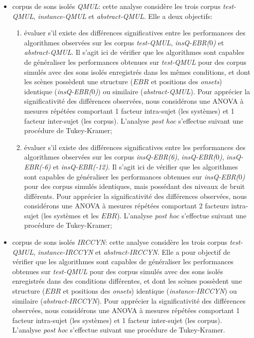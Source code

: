 \begin{itemize}

\item corpus de sons isolés \emph{QMUL}: cette analyse considère les trois corpus \emph{test-QMUL}, \emph{instance-QMUL} et \emph{abstract-QMUL}. Elle a deux objectifs:

\begin{enumerate}
\item évaluer s'il existe des différences significatives entre les performances des algorithmes observées sur les corpus \emph{test-QMUL}, \emph{insQ-EBR($0$)} et \emph{abstract-QMUL}. Il s'agit ici de vérifier que les algorithmes sont capables de généraliser les performances obtenues sur \emph{test-QMUL} pour des corpus simulés avec des sons isolés enregistrés dans les mêmes conditions, et dont les scènes possèdent une structure ($EBR$ et positions des \emph{onsets}) identique (\emph{insQ-EBR($0$)}) ou similaire (\emph{abstract-QMUL}). Pour apprécier la significativité des différences observées, nous considérons une ANOVA à mesures répétées comportant 1 facteur intra-sujet (les systèmes) et 1 facteur inter-sujet (les corpus). L'analyse \emph{post hoc} s'effectue suivant une procédure de Tukey-Kramer;

\item évaluer s'il existe des différences significatives entre les performances des algorithmes observées sur les corpus \emph{insQ-EBR(6)}, \emph{insQ-EBR($0$)}, \emph{insQ-EBR(-6)} et \emph{insQ-EBR(-12)}. Il s'agit ici de vérifier que les algorithmes sont capables de généraliser les performances obtenues sur \emph{insQ-EBR($0$)} pour des corpus simulés identiques, mais possédant des niveaux de bruit différents. Pour apprécier la significativité des différences observées, nous considérons une ANOVA à mesures répétées comportant 2 facteurs intra-sujet (les systèmes et les $EBR$). L'analyse \emph{post hoc} s'effectue suivant une procédure de Tukey-Kramer;

\end{enumerate}

\item corpus de sons isolés \emph{IRCCYN}: cette analyse considère les trois corpus \emph{test-QMUL}, \emph{instance-IRCCYN} et \emph{abstract-IRCCYN}. Elle a pour objectif de vérifier que les algorithmes sont capables de généraliser les performances obtenues sur \emph{test-QMUL} pour des corpus simulés avec des sons isolés enregistrés dans des conditions différentes, et dont les scènes possèdent une structure ($EBR$ et positions des \emph{onsets}) identique (\emph{instance-IRCCYN}) ou similaire (\emph{abstract-IRCCYN}). Pour apprécier la significativité des différences observées, nous considérons une ANOVA à mesures répétées comportant 1 facteur intra-sujet (les systèmes) et 1 facteur inter-sujet (les corpus). L'analyse \emph{post hoc} s'effectue suivant une procédure de Tukey-Kramer.

\end{itemize}

